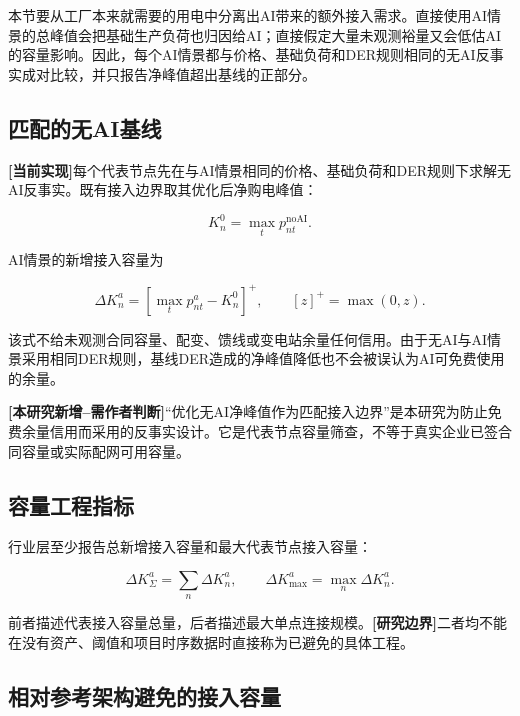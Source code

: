 \documentclass[preprint]{elsarticle}
\newcommand{\implemented}{\textcolor{green!40!black}{\textbf{[当前实现]}}}
\newcommand{\newwork}{\textcolor{orange!80!black}{\textbf{[本研究新增--需作者判断]}}}
\newcommand{\boundary}{\textcolor{black!65}{\textbf{[研究边界]}}}
\begin{document}
本节要从工厂本来就需要的用电中分离出AI带来的额外接入需求。直接使用AI情景的总峰值会把基础生产负荷也归因给AI；直接假定大量未观测裕量又会低估AI的容量影响。因此，每个AI情景都与价格、基础负荷和DER规则相同的无AI反事实成对比较，并只报告净峰值超出基线的正部分。

\subsection{匹配的无AI基线}

\implemented 每个代表节点先在与AI情景相同的价格、基础负荷和DER规则下求解无AI反事实。既有接入边界取其优化后净购电峰值：

\begin{equation}
 K^{0}_n=\max_t p^{\mathrm{noAI}}_{nt}.
 \label{eq:baseline-capacity}
\end{equation}

AI情景的新增接入容量为

\begin{equation}
 \Delta K^a_n=\left[\max_t p^a_{nt}-K^0_n\right]^+,
 \qquad[z]^+=\max(0,z).
 \label{eq:grid-expansion}
\end{equation}

该式不给未观测合同容量、配变、馈线或变电站余量任何信用。由于无AI与AI情景采用相同DER规则，基线DER造成的净峰值降低也不会被误认为AI可免费使用的余量。

\newwork “优化无AI净峰值作为匹配接入边界”是本研究为防止免费余量信用而采用的反事实设计。它是代表节点容量筛查，不等于真实企业已签合同容量或实际配网可用容量。

\subsection{容量工程指标}

行业层至少报告总新增接入容量和最大代表节点接入容量：

\begin{equation}
 \Delta K^a_{\Sigma}=\sum_n\Delta K^a_n,
 \qquad
 \Delta K^a_{\max}=\max_n\Delta K^a_n.
 \label{eq:grid-indicators}
\end{equation}

前者描述代表接入容量总量，后者描述最大单点连接规模。\boundary 二者均不能在没有资产、阈值和项目时序数据时直接称为已避免的具体工程。

\subsection{相对参考架构避免的接入容量}
\end{document}
